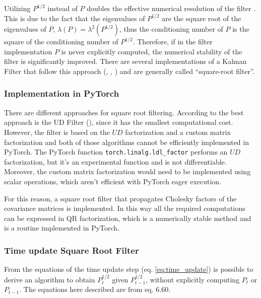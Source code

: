 \documentclass{article}
\begin{document}
Utilizing $P^{1/2}$ instead of $P$ doubles the effective numerical resolution of the filter \cite{kaminski_discrete_1971} \cite{dan_simon_optimal_2006} \cite{rutten_square-root_2013}. This is due to the fact that the eigenvalues of $P^{1/2}$ are the square root of the eigenvalues of $P$, $\lambda(P) = \lambda^2(P^{1/2})$, thus the conditioning number of $P$ is the square of the conditioning number of $P^{1/2}$. Therefore, if in the filter implementation $P$ is never explicitly computed, the numerical stability of the filter is significantly improved.
There are several implementations of a Kalman Filter that follow this approach (\cite{potter_statistical_1963}, \cite{carlson_fast_1973}, \cite{bierman_numerical_1977}) and are generally called ``square-root filter''.

\subsubsection{Implementation in PyTorch}

There are different approaches for square root filtering. According to \cite{mohinder_s_grewal_kalman_2001} the best approach is the UD Filter (\cite{bierman_numerical_1977}), since it has the smallest computational cost. However, the filter is based on the $UD$ factorization and a custom matrix factorization \cite{mohinder_s_grewal_kalman_2001} and both of those algorithms cannot be efficiently implemented in PyTorch. The PyTorch function \verb|torch.linalg.ldl_factor| performs an $UD$ factorization, but it's an experimental function and is not differentiable. Moreover, the custom matrix factorization would need to be implemented using scalar operations, which aren't efficient with PyTorch eager execution.

For this reason, a square root filter that propagates Cholesky factors of the covariance matrices is implemented. In this way all the required computations can be expressed in QR factorization, which is a numerically stable method and is a routine implemented in PyTorch.

\subsubsection{Time update Square Root Filter}

From the equations of the time update step (eq. \ref{eq:time_update}) is possible to derive an algorithm to obtain $P_t^{1/2}$ given $P_{t-1}^{1/2}$, without explicitly computing $P_t$ or $P_{t-1}$. The equations here described are from \cite{mohinder_s_grewal_kalman_2001} eq. 6.60.
\end{document}

